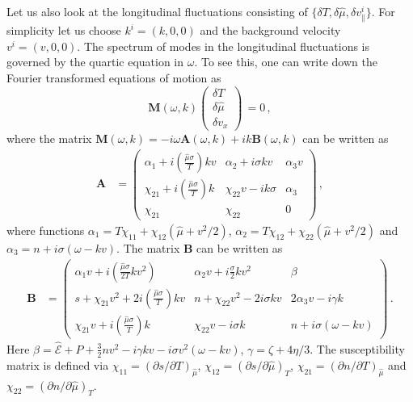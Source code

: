 \documentclass[superscriptaddress,prd,nofootinbib,preprintnumbers,longbibliography,11pt,eqsecnum]{revtex4-1}
\def\d{\partial}
\def\CE{\mathcal{E}}
\begin{document}
Let us also look at the longitudinal fluctuations consisting of $\{\delta T, \delta \hat{\mu}, \delta v^i_\parallel \}$. For simplicity let us choose $k^i = (k,0,0)$ and the background velocity $v^i=(v,0,0)$. The spectrum of modes in the longitudinal fluctuations is governed by the quartic equation in $\omega$. To see this, one can write down the Fourier transformed equations of motion as 
\begin{equation}\label{eq:eom-metM-Bargman}
  \mathbf{M}(\omega,k)
  \begin{pmatrix}
\delta T \\
\delta \hat{\mu} \\
\delta v_x 
  \end{pmatrix}\,  = 0\,,
\end{equation}
where the matrix $\mathbf{M}(\omega,k) = -i\omega \mathbf{A}(\omega,k) +ik \mathbf{B}(\omega,k)$ can be written as 
\begin{equation}
\begin{aligned}
\mathbf{A} &=
\begin{pmatrix}
\alpha_1 + i \left(\frac{\hat\mu \sigma}{T}  \right) kv  & \alpha_2 + i \sigma kv & \alpha_3 v \\
\chi_{21}+ i\left( \frac{\hat \mu \sigma}{T}\right) k & \chi_{22} v- i k \sigma & \alpha_3 \\
\chi_{21} & \chi_{22} & 0
\end{pmatrix} \,,
\end{aligned}
\label{eq:metA-BargmanSound}
\end{equation}
where functions $\alpha_1 =T \chi_{11} + \chi_{12} (\hat\mu + v^2/2)$, $\alpha_2 = T\chi_{12} + \chi_{22}(\hat\mu + v^2/2)$ and $\alpha_3 = n + i \sigma (\omega-kv)$. The matrix $\mathbf{B}$ can be written as 
\begin{equation}
\begin{aligned}
\mathbf{B} &= 
\begin{pmatrix}
\alpha_1v + i\left(\frac{\hat\mu \sigma}{2T} kv^2  \right) & \alpha_2 v + i\frac{\sigma}{2} kv^2 & \beta \\
s + \chi_{21}v^2 +2i\left( \frac{\hat\mu \sigma}{T} \right)kv & n + \chi_{22}v^2 -2i \sigma kv & 2 \alpha_3v -i \gamma k\\
\chi_{21}v + i\left( \frac{\hat\mu \sigma}{T} \right)k & \chi_{22}v - i \sigma k & n + i \sigma(\omega - kv)
\end{pmatrix}
\,.
\end{aligned}
\label{eq:metB-BargmanSound}
\end{equation}
Here $\beta = \hat{\CE} + P + \frac{3}{2} nv^2 - i \gamma kv - i \sigma v^2 (\omega -kv)$, $\gamma = \zeta + 4\eta/3$. The susceptibility matrix is defined via 
$\chi_{11} = (\d s/\d T)_{\hat\mu}$, $\chi_{12} = (\d s/\d \hat\mu)_T$, $\chi_{21} = (\d n/\d T)_{\hat\mu}$ and $\chi_{22} = (\d n/\d \hat\mu)_T$.
\end{document}
